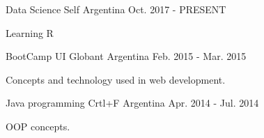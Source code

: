 \begin{cventries}
\cventry
{Data Science} %
{Self} %
{Argentina} %
{Oct. 2017 - PRESENT} %
{ %
\begin{cvitems}
\item {Learning R}
\end{cvitems}
}
\cventry
{BootCamp UI} %
{Globant} %
{Argentina} %
{Feb. 2015 - Mar. 2015} %
{ %
\begin{cvitems}
\item {Concepts and technology used in web development.}
\end{cvitems}
}
\cventry
{Java programming} %
{Crtl+F} %
{Argentina} %
{Apr. 2014 - Jul. 2014} %
{ %
\begin{cvitems}
\item {OOP concepts.}
\end{cvitems}
}
\end{cventries}
